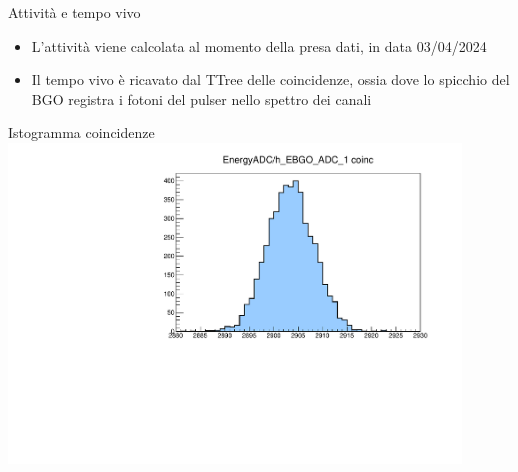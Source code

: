 \documentclass [xcolor=svgnames] {beamer}
\begin{document}
\begin{frame}{Attività e tempo vivo}
	\begin{itemize}
		\item L'attività viene calcolata al momento della presa dati, in data 03/04/2024
		\item Il tempo vivo è ricavato dal TTree delle coincidenze, ossia dove lo spicchio del BGO registra i fotoni del pulser nello spettro dei canali
	\end{itemize}
\end{frame}
\begin{frame}{Istogramma coincidenze}
	\centering
	\includegraphics[width=0.9\textwidth]{img/run1776_coinc_h_EBGO_ADC_1_COINC.pdf}
\end{frame}
\end{document}
